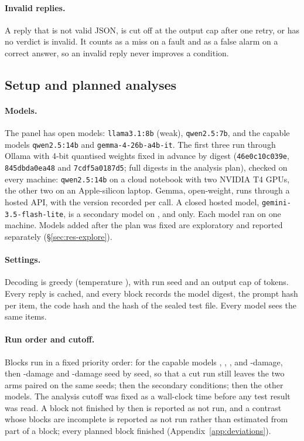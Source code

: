 \paragraph{Invalid replies.}
A reply that is not valid JSON, is cut off at the output cap after one retry, or has no verdict is invalid. It counts as a
miss on a fault and as a false alarm on a correct answer, so an invalid reply never improves a condition.

\subsection{Setup and planned analyses}
\label{app:study1-planned}
\label{sec:setup}

\paragraph{Models.}
The panel has \NPanelModels{} open models: \texttt{llama3.1:8b} (weak), \texttt{qwen2.5:7b}, and the \NCapable{} capable
models \texttt{qwen2.5:14b} and \texttt{gemma-4-26b-a4b-it}. The first three run through Ollama with 4-bit quantised
weights fixed in advance by digest (\texttt{46e0c10c039e}, \texttt{845dbda0ea48} and \texttt{7cdf5a0187d5}; full digests
in the analysis plan), checked on every machine: \texttt{qwen2.5:14b} on a cloud notebook with two NVIDIA T4 GPUs, the
other two on an Apple-silicon laptop. Gemma, open-weight, runs through a hosted API, with the version recorded per call.
A closed hosted model, \texttt{gemini-3.5-flash-lite}, is a secondary model on ,  and  only.
Each model ran on one machine. Models added after the plan was fixed are exploratory and reported separately
(\S\ref{sec:res-explore}).

\paragraph{Settings.}
Decoding is greedy (temperature \Temperature), with run seed \RunSeed{} and an output cap of \OutputCap{} tokens. Every
reply is cached, and every block records the model digest, the prompt hash per item, the code hash and the hash of the
sealed test file. Every model sees the same items.

\paragraph{Run order and cutoff.}
Blocks run in a fixed priority order: for the capable models , , ,  and
-damage, then -damage and -damage seed by seed, so that a cut run still leaves the two arms
paired on the same seeds; then the secondary conditions; then the other models. The analysis cutoff was fixed as a
wall-clock time before any test result was read. A block not finished by then is reported as not run, and a contrast whose blocks are
incomplete is reported as not run rather than estimated from part of a block; every planned block finished
(Appendix~\ref{app:deviations}).

